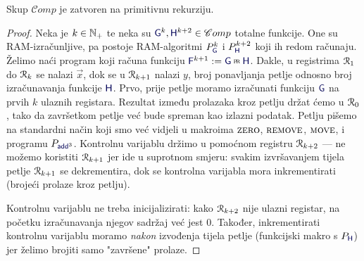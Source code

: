 \begin{lema}[{name=[zatvorenost skupa $\mathscr Comp$ na primitivnu rekurziju]}]\label{lm:prram}
Skup $\mathscr Comp$ je zatvoren na primitivnu rekurziju.
\end{lema}
\begin{proof}
Neka je $k\in{\mathbb N}_+$ te neka su $\f G^k,\f H^{k+2}\in\mathscr Comp$ totalne funkcije. One su RAM-izračunljive, pa postoje RAM-algoritmi $P_{\f G}^k$ i $P_{\f H}^{k+2}$ koji ih redom računaju. Želimo naći program koji računa funkciju $\f F^{k+1}:=\f G\pr\f H$. Dakle, u registrima $\mathcal R_{1}$ do $\mathcal R_{k}$ se nalazi $\vec x$, dok se u $\mathcal R_{k+1}$ nalazi $y$, broj ponavljanja petlje odnosno broj izračunavanja funkcije $\f H$. Prvo, prije petlje moramo izračunati funkciju $\f G$ na prvih $k$ ulaznih registara. Rezultat između prolazaka kroz petlju držat ćemo u $\mathcal R_{0}$, tako da završetkom petlje već bude spreman kao izlazni podatak. Petlju pišemo na standardni način koji smo već vidjeli u makroima $\textsc{zero}$, $\textsc{remove}$, $\textsc{move}$, i programu $P_{\f{add}^3}$. Kontrolnu varijablu držimo u pomoćnom registru $\mathcal R_{k+2}$ --- ne možemo koristiti $\mathcal R_{k+1}$ jer ide u suprotnom smjeru: svakim izvršavanjem tijela petlje $\mathcal R_{k+1}$ se dekrementira, dok se kontrolna varijabla mora inkrementirati (brojeći prolaze kroz petlju).

	Kontrolnu varijablu ne treba inicijalizirati: kako $\mathcal R_{k+2}$ nije ulazni registar, na početku izračunavanja njegov sadržaj već jest $0$. Također, inkrementirati kontrolnu varijablu moramo \emph{nakon} izvođenja tijela petlje (funkcijski makro s $P_{\f H}$) jer želimo brojiti samo "završene" prolaze. %


\end{proof}
